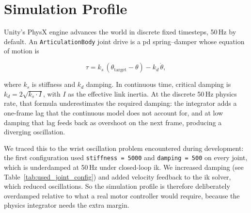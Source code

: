 \documentclass[
     12pt,
     a4paper,
     BCOR=10mm,
     DIV=14,
     listof=totoc,
     bibliography=totoc,
     parskip,
     twoside,
     headsepline
     ]{scrreprt}
\begin{document}
\section{Simulation Profile}
Unity's PhysX engine advances the world in discrete fixed timesteps, 50\,Hz by default. An \texttt{ArticulationBody} joint drive is a \gls{pd} spring--damper whose equation of motion is

\begin{equation}
	\tau = k_s \, (\theta_{\text{target}} - \theta) - k_d \, \dot{\theta},
\end{equation}

where $k_s$ is stiffness and $k_d$ damping. In continuous time, critical damping is $k_d = 2\sqrt{k_s \cdot I}$, with $I$ as the effective link inertia. At the discrete 50\,Hz physics rate, that formula underestimates the required damping: the integrator adds a one-frame lag that the continuous model does not account for, and at low damping that lag feeds back as overshoot on the next frame, producing a diverging oscillation.

We traced this to the wrist oscillation problem encountered during development: the first configuration used \texttt{stiffness = 5000} and \texttt{damping = 500} on every joint, which is underdamped at 50\,Hz under closed-loop \gls{ik}. We increased damping (see Table~\ref{tab:used_joint_config}) and added velocity feedback to the \gls{ik} solver, which reduced oscillations. So the simulation profile is therefore deliberately overdamped relative to what a real motor controller would require, because the physics integrator needs the extra margin.
\end{document}
